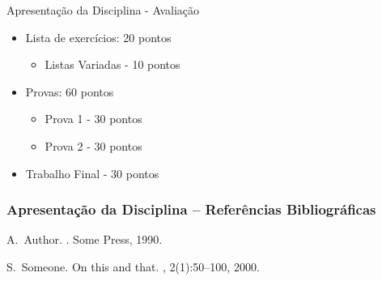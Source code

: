 \documentclass{beamer}
\begin{document}

\begin{frame}{Apresentação da Disciplina - Avaliação}
\begin{itemize}
\item Lista de exercícios: 20 pontos
\begin{itemize}
    \item Listas Variadas - 10 pontos
\end{itemize}
\item Provas: 60 pontos
\begin{itemize}
    \item Prova 1 - 30 pontos
    \item Prova 2 - 30 pontos
\end{itemize}
\item Trabalho Final - 30 pontos
\end{itemize}
\end{frame}

\usebackgroundtemplate{ }


\begin{frame}[allowframebreaks]
  \frametitle<presentation>{Apresentação da Disciplina – Referências Bibliográficas}
    
  \begin{thebibliography}{10}
    
  \beamertemplatebookbibitems

    A.~Author.
    .
    \newblock Some Press, 1990.
 
    
  \beamertemplatearticlebibitems

    S.~Someone.
    \newblock On this and that.
    , 2(1):50--100,
    2000.
  \end{thebibliography}
\end{frame}
\end{document}
